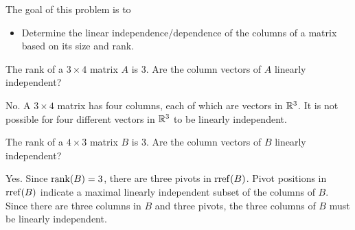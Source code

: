 \documentclass{workbook}
\newcommand{\bookonlynewpage}{\begin{bookonly}\newpage\end{bookonly}}
\begin{document}
\begin{slide}

	\begin{bookonly}\end{bookonly}
	\bookonlynewpage
	\question
	\begin{annotation}
		\begin{goals}

			The goal of this problem is to
			\begin{itemize}
				\item Determine the linear independence/dependence of the columns of a matrix
					based on its size and rank.
			\end{itemize}
		\end{goals}
	\end{annotation}
	\begin{parts}
		\item The rank of a $3\times 4$ matrix $A$ is $3$.
			Are the column vectors of $A$ linearly independent?
			\begin{solution}
				No. A $3 \times 4$ matrix has four columns, each of which are
				vectors in $\mathbb{R}^3$. It is not possible for four different vectors
				in $\mathbb{R}^3$ to be linearly independent.
			\end{solution}
		\item The rank of a $4\times 3$ matrix $B$ is $3$.
			Are the column vectors of $B$ linearly independent?
			\begin{solution}
				Yes. Since $\operatorname{rank}(B)=3$, there are three pivots in $\operatorname{rref}(B)$.
				Pivot positions in $\operatorname{rref}(B)$ indicate a maximal linearly
				independent subset of the columns of $B$. Since there are three
				columns in $B$ and three pivots, the three columns of $B$ must be
				linearly independent.
			\end{solution}
	\end{parts}

\end{slide}
\end{document}
